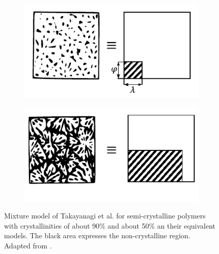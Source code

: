 \begin{figure}[hbtp]
\centering
\begin{subfigure}[b]{0.45\textwidth}
\centering
\includegraphics[width=\textwidth]{figures/takaynagi_low}
\caption{}
\label{subfig:takaynagi_low}
\end{subfigure} \hfill
	\begin{subfigure}[b]{0.45\textwidth}
		\centering
						\includegraphics[width=\textwidth]{figures/takaynagi_high}
						\caption{}
						\label{subfig:takaynagi_high}
		\end{subfigure}
	\caption{Mixture model of Takayanagi et al. \citep{takayanagiApplicationEquivalentModel1964} for semi-crystalline polymers with crystallinities of  about 90\% and  about 50\% an their equivalent models. The black area expresses the non-crystalline region. Adapted from \cite{takayanagiApplicationEquivalentModel1964}. }
\label{fig:model_takayanagi}
\end{figure}


